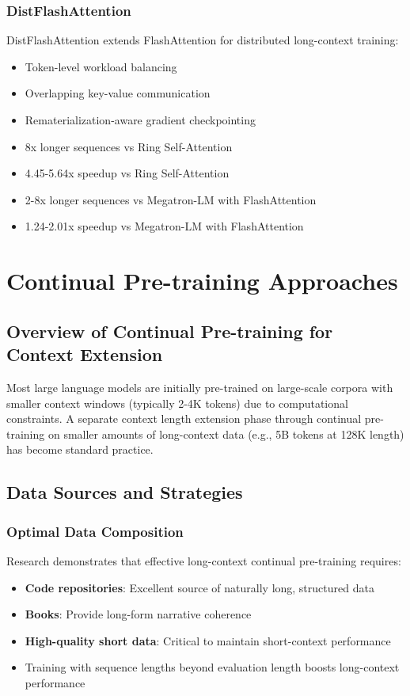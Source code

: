 \documentclass[11pt,letterpaper]{article}
\begin{document}
\subsubsection{DistFlashAttention}
DistFlashAttention extends FlashAttention for distributed long-context training:
\begin{itemize}[leftmargin=*]
    \item Token-level workload balancing
    \item Overlapping key-value communication
    \item Rematerialization-aware gradient checkpointing
    \item 8x longer sequences vs Ring Self-Attention
    \item 4.45-5.64x speedup vs Ring Self-Attention
    \item 2-8x longer sequences vs Megatron-LM with FlashAttention
    \item 1.24-2.01x speedup vs Megatron-LM with FlashAttention
\end{itemize}

\section{Continual Pre-training Approaches}

\subsection{Overview of Continual Pre-training for Context Extension}

Most large language models are initially pre-trained on large-scale corpora with smaller context windows (typically 2-4K tokens) due to computational constraints. A separate context length extension phase through continual pre-training on smaller amounts of long-context data (e.g., 5B tokens at 128K length) has become standard practice.

\subsection{Data Sources and Strategies}

\subsubsection{Optimal Data Composition}
Research demonstrates that effective long-context continual pre-training requires:
\begin{itemize}[leftmargin=*]
    \item \textbf{Code repositories}: Excellent source of naturally long, structured data
    \item \textbf{Books}: Provide long-form narrative coherence
    \item \textbf{High-quality short data}: Critical to maintain short-context performance
    \item Training with sequence lengths beyond evaluation length boosts long-context performance
\end{itemize}
\end{document}
